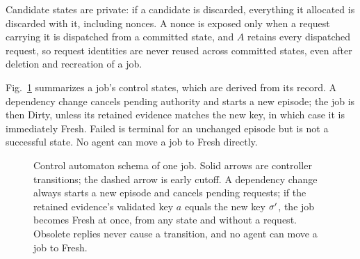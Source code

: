 Candidate states are private: if a candidate is discarded, everything it allocated is discarded with it, including nonces. A nonce is exposed only when a request carrying it is dispatched from a committed state, and $A$ retains every dispatched request, so request identities are never reused across committed states, even after deletion and recreation of a job.

Fig.~\ref{fig:automaton} summarizes a job's control states, which are derived from its record. A dependency change cancels pending authority and starts a new episode; the job is then Dirty, unless its retained evidence matches the new key, in which case it is immediately Fresh. Failed is terminal for an unchanged episode but is not a successful state. No agent can move a job to Fresh directly.

\begin{figure}[!t]
\centering
{}%
\caption{Control automaton schema of one job. Solid arrows are controller transitions; the dashed arrow is early cutoff. A dependency change always starts a new episode and cancels pending requests; if the retained evidence's validated key $a$ equals the new key $\sigma'$, the job becomes Fresh at once, from any state and without a request. Obsolete replies never cause a transition, and no agent can move a job to Fresh.}\label{fig:automaton}
\end{figure}

